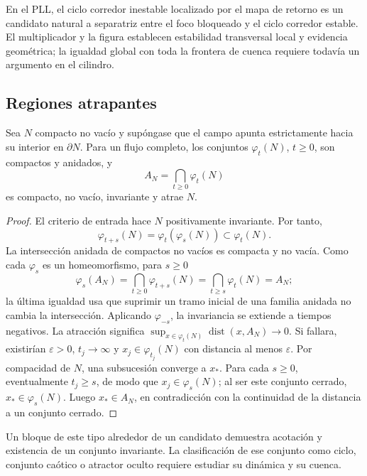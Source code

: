En el PLL, el ciclo corredor inestable localizado por el mapa de retorno es un
candidato natural a separatriz entre el foco bloqueado y el ciclo corredor
estable. El multiplicador y la figura establecen estabilidad transversal local
y evidencia geométrica; la igualdad global con toda la frontera de cuenca
requiere todavía un argumento en el cilindro.

\subsection{Regiones atrapantes}

\begin{proposition}
Sea \(N\) compacto no vacío y supóngase que el campo apunta estrictamente hacia su
interior en \(\partial N\). Para un flujo completo, los conjuntos
\(\varphi_t(N)\), \(t\ge0\), son compactos y anidados, y
\begin{equation}
 A_N=\bigcap_{t\ge0}\varphi_t(N)
 \label{geo:eq:maximal-invariant-trapping}
\end{equation}
es compacto, no vacío, invariante y atrae \(N\).
\end{proposition}

\begin{proof}
El criterio de entrada hace \(N\) positivamente invariante. Por tanto,
\[
 \varphi_{t+s}(N)=\varphi_t(\varphi_s(N))\subset\varphi_t(N).
\]
La intersección anidada de compactos no vacíos es compacta y no vacía.
Como cada \(\varphi_s\) es un homeomorfismo, para \(s\ge0\)
\[
 \varphi_s(A_N)=\bigcap_{t\ge0}\varphi_{t+s}(N)
 =\bigcap_{t\ge s}\varphi_t(N)=A_N;
\]
la última igualdad usa que suprimir un tramo inicial de una familia anidada
no cambia la intersección. Aplicando \(\varphi_{-s}\), la invariancia se
extiende a tiempos negativos.
La atracción significa
\(\sup_{x\in\varphi_t(N)}\operatorname{dist}(x,A_N)\to0\).
Si fallara, existirían \(\varepsilon>0\), \(t_j\to\infty\) y
\(x_j\in\varphi_{t_j}(N)\) con distancia al menos \(\varepsilon\).
Por compacidad de \(N\), una subsucesión converge a \(x_*\). Para cada
\(s\ge0\), eventualmente \(t_j\ge s\), de modo que
\(x_j\in\varphi_s(N)\); al ser este conjunto cerrado,
\(x_*\in\varphi_s(N)\). Luego \(x_*\in A_N\), en contradicción con
la continuidad de la distancia a un conjunto cerrado.
\end{proof}

Un bloque de este tipo alrededor de un candidato demuestra acotación y
existencia de un conjunto invariante. La clasificación de ese conjunto como
ciclo, conjunto caótico o atractor oculto requiere estudiar su dinámica y su
cuenca.


